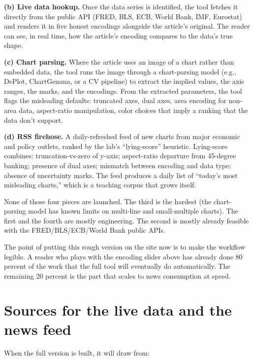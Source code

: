 \documentclass[
  letterpaper,
  11pt,
  twoside,
  openany]{scrbook}
\begin{document}
\textbf{(b) Live data hookup.} Once the data series is identified, the
tool fetches it directly from the public API (FRED, BLS, ECB, World
Bank, IMF, Eurostat) and renders it in five honest encodings alongside
the article's original. The reader can see, in real time, how the
article's encoding compares to the data's true shape.

\textbf{(c) Chart parsing.} Where the article uses an image of a chart
rather than embedded data, the tool runs the image through a
chart-parsing model (e.g., DePlot, ChartGemma, or a CV pipeline) to
extract the implied values, the axis ranges, the marks, and the
encodings. From the extracted parameters, the tool flags the misleading
defaults: truncated axes, dual axes, area encoding for non-area data,
aspect-ratio manipulation, color choices that imply a ranking that the
data don't support.

\textbf{(d) RSS firehose.} A daily-refreshed feed of new charts from
major economic and policy outlets, ranked by the lab's ``lying-score''
heuristic. Lying-score combines: truncation-vs-zero of y-axis;
aspect-ratio departure from 45-degree banking; presence of dual axes;
mismatch between encoding and data type; absence of uncertainty marks.
The feed produces a daily list of ``today's most misleading charts,''
which is a teaching corpus that grows itself.

None of those four pieces are launched. The third is the hardest (the
chart-parsing model has known limits on multi-line and small-multiple
charts). The first and the fourth are mostly engineering. The second is
mostly already feasible with the FRED/BLS/ECB/World Bank public APIs.

The point of putting this rough version on the site now is to make the
workflow legible. A reader who plays with the encoding slider above has
already done 80 percent of the work that the full tool will eventually
do automatically. The remaining 20 percent is the part that scales to
news consumption at speed.

\section{Sources for the live data and the news
feed}\label{sources-for-the-live-data-and-the-news-feed}

When the full version is built, it will draw from:
\end{document}
